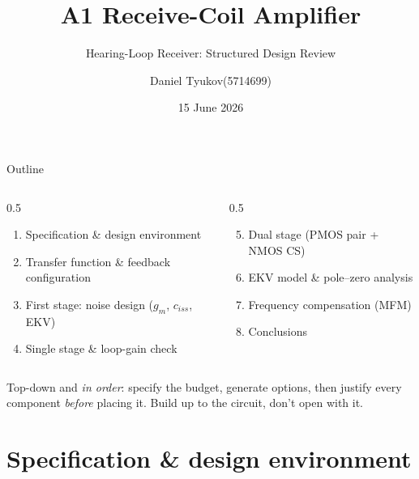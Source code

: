 \documentclass[aspectratio=169,9pt]{beamer}
\title{A1 Receive-Coil Amplifier}
\subtitle{Hearing-Loop Receiver: Structured Design Review}
\author{Daniel Tyukov\quad(5714699)}
\date{15 June 2026}
\begin{document}
{
\begin{frame}[plain]\titlepage\end{frame}}

\begin{frame}{Outline}
  \begin{columns}[T]
    \begin{column}{0.5\textwidth}
      \begin{enumerate}
        \item Specification \& design environment
        \item Transfer function \& feedback configuration
        \item First stage: noise design ($g_m$, $c_{iss}$, EKV)
        \item Single stage \& loop-gain check
      \end{enumerate}
    \end{column}
    \begin{column}{0.5\textwidth}
      \begin{enumerate}\setcounter{enumi}{4}
        \item Dual stage (PMOS pair + NMOS CS)
        \item EKV model \& pole--zero analysis
        \item Frequency compensation (MFM)
        \item Conclusions
      \end{enumerate}
    \end{column}
  \end{columns}
  \vfill
  \begin{antoonbox}
  Top-down and \emph{in order}: specify the budget, generate options, then justify every
  component \emph{before} placing it. Build up to the circuit, don't open with it.
  \end{antoonbox}
\end{frame}

\section{Specification \& design environment}
\end{document}
